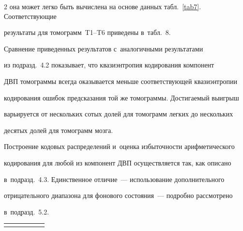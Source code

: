 \begin{multicols}{2}
она может легко быть вычислена на основе данных табл.~\ref{tab7}. Соответст\-ву\-ющие 

результаты для томограмм~T1--T6 приведены в~табл.~8.



Сравнение приведенных результатов с~аналогичными результатами 

из подразд.~4.2 показывает, что квазиэнтропия кодирования компонент 

ДВП томограммы всегда оказывается меньше соответствующей квазиэнтропии 

кодирования ошибок предсказания той же томограммы. Достигаемый выигрыш 

варьируется от нескольких сотых долей для томограмм легких до нескольких 

десятых долей для томограмм мозга.



Построение кодовых распределений и~оценка избыточности арифметического 

кодирования для любой из компонент ДВП осуществляется так, как описано 

в~подразд.~4.3. Единственное отличие~--- использование дополнительного 

отрицательного диапазона для фонового состояния~--- подробно рассмотрено 

в~подразд.~5.2.








\setcounter{table}{8}



\begin{table}[b]\small

\vspace*{-9pt}

\begin{center}


\label{tab9}

\vspace{2ex}



\tabcolsep=11pt

\begin{tabular}{|c|c|c|c|c|c|}

\hline

&&&&&\\[-9pt]


\end{tabular}
\end{center}
\end{table}
\end{multicols}
